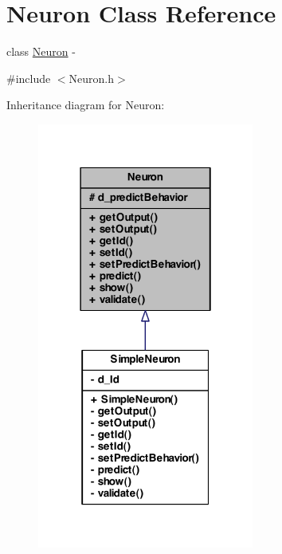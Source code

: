 \hypertarget{class_neuron}{
\section{Neuron Class Reference}
\label{class_neuron}
}


class \hyperlink{class_neuron}{Neuron} -\/  




{\ttfamily \#include $<$Neuron.h$>$}



Inheritance diagram for Neuron:\nopagebreak
\begin{figure}[H]
\begin{center}
\leavevmode
\includegraphics[width=202pt]{class_neuron__inherit__graph}
\end{center}
\end{figure}
